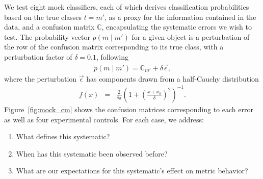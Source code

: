 We test eight mock classifiers, each of which derives classification probabilities based on the true classes $t = m'$, as a proxy for the information contained in the data, and a confusion matrix $\mathbb{C}$, encapsulating the systematic errors we wish to test.
The probability vector $p(m \mid m')$ for a given object is a perturbation of the row of the confusion matrix corresponding to its true class, with a perturbation factor of $\delta=0.1$, following
\begin{eqnarray}
  \label{eq:cmtoprob}
  p(m \mid m') = \mathbb{C}_{m'} + \delta\vec{\epsilon},
\end{eqnarray}
where the perturbation $\vec{\epsilon}$ has components drawn from a half-Cauchy distribution
\begin{eqnarray}
  \label{eq:cauchy}
  f(x) &=& \frac{2}{\delta\pi}\left(1+\left(\frac{x+x_{0}}{\delta}\right)^{2}\right)^{-1}.
\end{eqnarray}
Figure~\ref{fig:mock_cm} shows the confusion matrices corresponding to each error as well as four experimental controls.
For each case, we address:
\begin{enumerate}
  \item What defines this systematic?
  \item When has this systematic been observed before?
  \item What are our expectations for this systematic's effect on metric behavior?
\end{enumerate}

